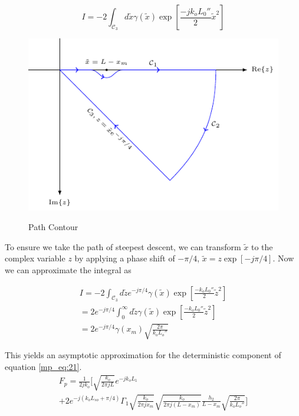 \begin{equation}
I = -2\int_{\mathcal{C}_3}d\tilde{x} \gamma(\tilde{x})\exp\left[\frac{-jk_oL_0''}{2}\tilde{x}^2\right]
\label{mp_eq:24}
\end{equation}

\begin{figure}[H]
  \begin{center}
\includegraphics[width=5in]{../media/path_contour-figure1.pdf}
  \end{center}
  \renewcommand{\baselinestretch}{1} \small\normalsize
  \begin{quote}
    \caption[Path Contour]{ Path Contour\label{mp_fig:6}}
  \end{quote}
\end{figure}
\renewcommand{\baselinestretch}{2} \small\normalsize

To ensure we take the path of steepest descent, we can transform $\tilde{x}$ to the complex variable $z$ by applying a phase shift of $-\pi/4$, $\tilde{x} = z\exp[-j\pi/4]$. Now we can approximate the integral as

\begin{equation}
\begin{gathered}
I = -2\int_{\mathcal{C}_3}d\tilde{z}e^{-j\pi/4} \gamma(\tilde{x})\exp\left[\frac{-k_oL_0''}{2}\tilde{z}^2\right]  \\
= 2e^{-j\pi/4}\int_{0}^{\infty}d\tilde{z}\gamma(\tilde{x})\exp\left[\frac{-k_oL_0''}{2}\tilde{z}^2\right]  \\
= 2e^{-j\pi/4}\gamma(x_m)\sqrt{\frac{2\pi}{k_oL_o''}}
\end{gathered}
\label{mp_eq:25}
\end{equation}

This yields an asymptotic approximation for the deterministic component of equation \ref{mp_eq:21}.
\begin{equation}
\begin{gathered}
F_p= \frac{1}{2jk_o}\Biggl[\sqrt{\frac{k_o}{2\pi jL}}e^{-jk_oL_1}\\ + 2e^{-j\left(k_oL_{so}+\pi/4\right)}\Gamma_1 \sqrt{\frac{k_o}{2\pi jx_m}}\sqrt{\frac{k_o}{2\pi j (L-x_m)}}\frac{h_2}{L-x_m}\sqrt{\frac{2\pi}{k_oL_o''}}\Biggr]
\end{gathered}
\label{mp_eq:26}
\end{equation}

